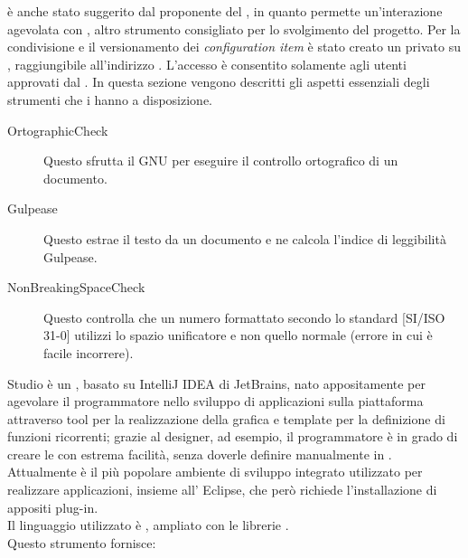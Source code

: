 		 è anche stato suggerito dal proponente del , in quanto permette un'interazione agevolata con , altro strumento consigliato per lo svolgimento del progetto. 
			Per la condivisione e il versionamento dei \textit{configuration item} è stato creato un  privato su , raggiungibile all’indirizzo . L’accesso è consentito solamente agli utenti approvati dal .
		In questa sezione vengono descritti gli aspetti essenziali degli strumenti che i  hanno a disposizione.
		\begin{description}
			\item[OrtographicCheck] Questo  sfrutta il  GNU  per eseguire il controllo ortografico di un documento.
			\item[Gulpease] Questo  estrae il testo da un documento e ne calcola l'indice di leggibilità Gulpease.
			\item[NonBreakingSpaceCheck] Questo  controlla che un numero formattato secondo lo standard [SI/ISO 31-0] utilizzi lo spazio unificatore e non quello normale (errore in cui è facile incorrere).
		\end{description}
		 Studio è un , basato su IntelliJ IDEA di JetBrains, nato appositamente per agevolare il programmatore nello sviluppo di applicazioni sulla piattaforma  attraverso tool per la realizzazione della grafica e template per la definizione di funzioni ricorrenti; grazie al designer, ad esempio, il programmatore è in grado di creare le  con estrema facilità,  senza doverle definire manualmente in .\\
		Attualmente è il più popolare ambiente di sviluppo integrato utilizzato per realizzare applicazioni, insieme all' Eclipse, che però richiede l'installazione di appositi plug-in.\\ 
		Il linguaggio utilizzato è , ampliato con le librerie .\\
		Questo strumento fornisce:

